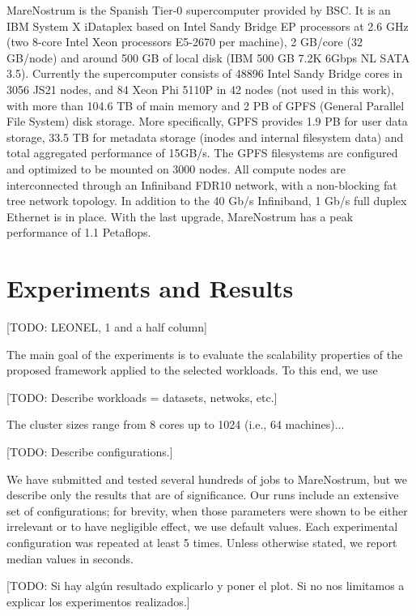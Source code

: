 \documentclass[journal]{IEEEtran}
\begin{document}
MareNostrum is the Spanish Tier-0 supercomputer provided by BSC. It is an IBM System X iDataplex based on Intel Sandy Bridge EP processors at 2.6 GHz (two 8-core Intel Xeon processors E5-2670 per machine), 2 GB/core (32 GB/node) and around 500 GB of local disk (IBM 500 GB  7.2K 6Gbps NL SATA 3.5). Currently the supercomputer consists of 48896 Intel Sandy Bridge cores in 3056 JS21 nodes, and 84 Xeon Phi 5110P in 42 nodes (not used in this work), with more than 104.6 TB of main memory and 2 PB of GPFS (General Parallel File System) disk storage. More specifically, GPFS provides 1.9 PB for user data storage,
33.5 TB for metadata storage (inodes and internal filesystem data) and total aggregated performance of 15GB/s.
The GPFS filesystems are configured and optimized to be mounted on 3000 nodes.
All compute nodes are interconnected through an Infiniband FDR10 network, with a non-blocking fat tree network topology. In addition to the  40 Gb/s Infiniband, 1 Gb/s full duplex Ethernet is in place.
With the last upgrade,  MareNostrum has a peak performance of 1.1 Petaflops.

\section{Experiments and Results}

[TODO: LEONEL, 1 and a half column]

The main goal of the experiments is to evaluate the scalability properties of the proposed framework applied to the selected workloads. To this end, we use 

[TODO: Describe workloads = datasets, netwoks, etc.]

The cluster sizes range from 8 cores up to 1024 (i.e., 64 machines)...

[TODO: Describe configurations.]

We have submitted and tested several hundreds of jobs to MareNostrum, but we describe only the results that are of significance. Our runs include an extensive  set of configurations; for brevity, when those parameters were shown to be either irrelevant or to have negligible effect, we use default values. Each experimental configuration was repeated at least 5 times. Unless otherwise stated, we report median values in seconds. 

[TODO: Si hay algún resultado explicarlo y poner el plot. Si no nos limitamos a explicar los experimentos realizados.]
\end{document}
